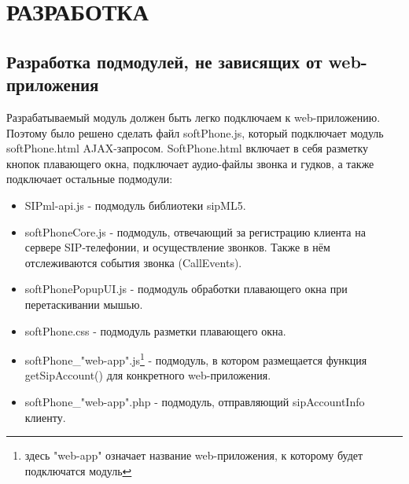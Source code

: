 \chapter{РАЗРАБОТКА}

\section{Разработка подмодулей, не зависящих от web-приложения}

Разрабатываемый модуль должен быть легко подключаем к web-приложению. Поэтому было решено сделать файл softPhone.js, который подключает модуль softPhone.html AJAX-запросом. SoftPhone.html включает в себя разметку кнопок плавающего окна, подключает аудио-файлы звонка и гудков, а также подключает остальные подмодули:
\begin{itemize}
\item SIPml-api.js - подмодуль библиотеки sipML5.
\item softPhoneCore.js - подмодуль, отвечающий за регистрацию клиента на сервере SIP-телефонии, и осуществление звонков. Также в нём отслеживаются события звонка (CallEvents).
\item softPhonePopupUI.js - подмодуль обработки плавающего окна при перетаскивании мышью.
\item softPhone.css - подмодуль разметки плавающего окна.
\item softPhone\_"web-app".js\footnote{здесь "web-app" означает название web-приложения, к которому будет подключатся модуль} - подмодуль, в котором размещается функция getSipAccount() для конкретного web-приложения.
\item softPhone\_"web-app".php - подмодуль, отправляющий sipAccountInfo клиенту.
\end{itemize}

